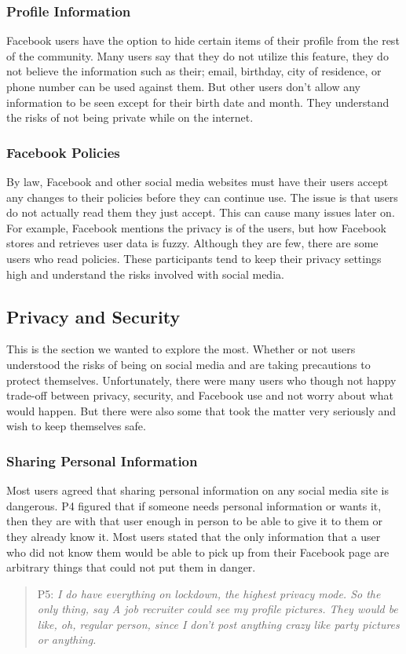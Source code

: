 \subsubsection{Profile Information}
Facebook users have the option to hide certain items of their profile from the rest of the community. Many users say that they do not utilize this feature, they do not believe the information such as their; email, birthday, city of residence, or phone number can be used against them. But other users don't allow any information to be seen except for their birth date and month. They understand the risks of not being private while on the internet.

\subsubsection{Facebook Policies}
By law, Facebook and other social media websites must have their users accept any changes to their policies before they can continue use. The issue is that users do not actually read them they just accept. This can cause many issues later on. For example, Facebook mentions the privacy is of the users, but how Facebook stores and retrieves user data is fuzzy. Although they are few, there are some users who read policies. These participants tend to keep their privacy settings high and understand the risks involved with social media.

\subsection{Privacy and Security}
This is the section we wanted to explore the most. Whether or not users understood the risks of being on social media and are taking precautions to protect themselves. Unfortunately, there were many users who though not happy trade-off between privacy, security, and Facebook use and not worry about what would happen. But there were also some that took the matter very seriously and wish to keep themselves safe.

\subsubsection{Sharing Personal Information}
Most users agreed that sharing personal information on any social media site is dangerous. P4 figured that if someone needs personal information or wants it, then they are with that user enough in person to be able to give it to them or they already know it. Most users stated that the only information that a user who did not know them would be able to pick up from their Facebook page are arbitrary things that could not put them in danger.
\begin{quote}
P5: \textit{I do have everything on lockdown, the highest privacy mode. So the only thing, say A job recruiter could see my profile pictures. They would be like, oh, regular person, since I don't post anything crazy like party pictures or anything.}
\end{quote}

